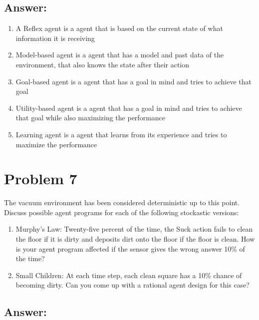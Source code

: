 \documentclass{article}
\begin{document}
\subsection*{Answer:}

\begin{enumerate}[label= (\alph*)]
    \item A Reflex agent is a agent that is based on the current state of what information it is receiving
    \item Model-based agent is a agent that has a model and past data of the environment, that also knows the state after their action
    \item Goal-based agent is a agent that has a goal in mind and tries to achieve that goal
    \item Utility-based agent is a agent that has a goal in mind and tries to achieve that goal while also maximizing the performance 
    \item Learning agent is a agent that learns from its experience and tries to maximize the performance 
\end{enumerate}

\section*{Problem 7}

The vacuum environment has been considered deterministic up to this point. Discuss possible agent programs for each of the following stockastic versions:

\begin{enumerate}[label= (\alph*)]
    \item Murphy's Law: Twenty-five percent of the time, the Suck action fails to clean the floor if it is dirty and deposits dirt onto the floor if the floor is clean. How is your agent program affected if the sensor gives the wrong answer 10\% of the time?
    \item Small Children: At each time step, each clean square has a 10\% chance of becoming dirty. Can you come up with a rational agent design for this case?
\end{enumerate}

\subsection*{Answer:}
\end{document}
